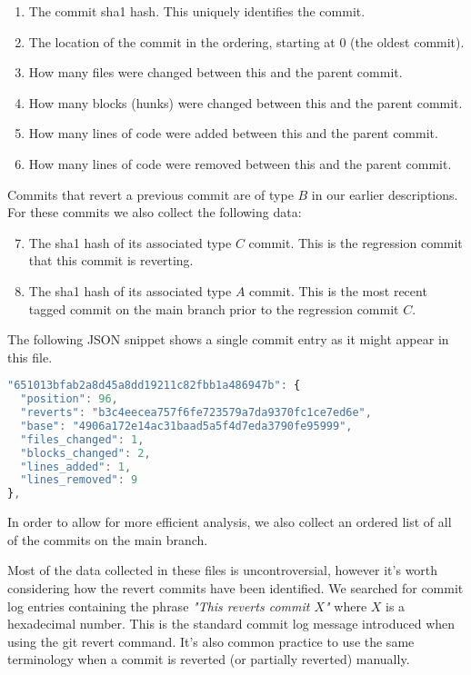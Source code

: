 \documentclass[10pt,journal,compsoc]{IEEEtran}
\begin{document}
\begin{enumerate}
\item The commit sha1 hash. This uniquely identifies the commit.
\item The location of the commit in the ordering, starting at 0 (the oldest commit).
\item How many files were changed between this and the parent commit.
\item How many blocks (hunks) were changed between this and the parent commit.
\item How many lines of code were added between this and the parent commit.
\item How many lines of code were removed between this and the parent commit.
\end{enumerate}

Commits that revert a previous commit are of type $B$ in our earlier descriptions. For these commits we also collect the following data:

\begin{enumerate}
\setcounter{enumi}{6}
\item The sha1 hash of its associated type $C$ commit. This is the regression commit that this commit is reverting.
\item The sha1 hash of its associated type $A$ commit. This is the most recent tagged commit on the main branch prior to the regression commit $C$. 
\end{enumerate}

The following JSON snippet shows a single commit entry as it might appear in this file.

\begin{lstlisting}[language=JavaScript]
"651013bfab2a8d45a8dd19211c82fbb1a486947b": {
  "position": 96,
  "reverts": "b3c4eecea757f6fe723579a7da9370fc1ce7ed6e",
  "base": "4906a172e14ac31baad5a5f4d7eda3790fe95999",
  "files_changed": 1,
  "blocks_changed": 2,
  "lines_added": 1,
  "lines_removed": 9
},
\end{lstlisting}

In order to allow for more efficient analysis, we also collect an ordered list of all of the commits on the main branch. 

Most of the data collected in these files is uncontroversial, however it's worth considering how the revert commits have been identified. We searched for commit log entries containing the phrase {\it"This reverts commit $X$"\/} where $X$ is a hexadecimal number. This is the standard commit log message introduced when using the {\code git revert} command. It's also common practice to use the same terminology when a commit is reverted (or partially reverted) manually.
\end{document}
